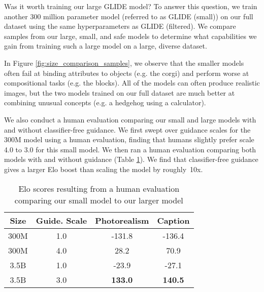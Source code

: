 \documentclass{article}
\newcommand{\modelname}{GLIDE}
\begin{document}
Was it worth training our large \modelname{} model? To answer this question, we train another 300 million parameter model (referred to as \modelname{} (small)) on our full dataset using the same hyperparameters as \modelname{} (filtered). We compare samples from our large, small, and safe models to determine what capabilities we gain from training such a large model on a large, diverse dataset.

In Figure \ref{fig:size_comparison_samples}, we observe that the smaller models often fail at binding attributes to objects (e.g. the corgi) and perform worse at compositional tasks (e.g. the blocks). All of the models can often produce realistic images, but the two models trained on our full dataset are much better at combining unusual concepts (e.g. a hedgehog using a calculator).

We also conduct a human evaluation comparing our small and large models with and without classifier-free guidance. We first swept over guidance scales for the 300M model using a human evaluation, finding that humans slightly prefer scale 4.0 to 3.0 for this small model. We then ran a human evaluation comparing both models with and without guidance (Table \ref{tab:humaneval_modelsize}). We find that classifier-free guidance gives a larger Elo boost than scaling the model by roughly~10x.

\begin{table}[t]
    \caption{Elo scores resulting from a human evaluation comparing our small model to our larger model}
    \label{tab:humaneval_modelsize}
    \vskip 0.15in
    \centering
    \begin{center}
    \begin{small}
    \begin{tabular}{cccc}
    \toprule
    Size & Guide. Scale & Photorealism & Caption \\
    \midrule
    300M & 1.0 & -131.8 & -136.4 \\
    300M & 4.0 & 28.2 & 70.9 \\
    3.5B & 1.0 & -23.9 & -27.1 \\
    3.5B & 3.0 & \bf 133.0 & \bf 140.5 \\
    \bottomrule
    \end{tabular}
    \end{small}
    \end{center}
    \vskip -0.2in
\end{table}
\end{document}
